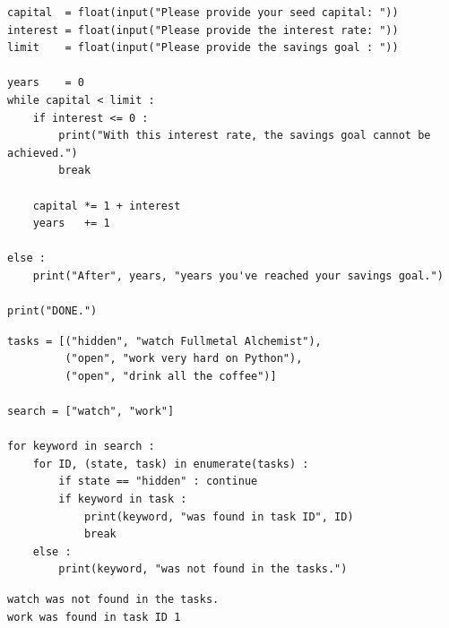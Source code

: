 \begin{frame}[fragile]
%
\begin{codebox}
\begin{verbatim}
capital  = float(input("Please provide your seed capital: "))
interest = float(input("Please provide the interest rate: "))
limit    = float(input("Please provide the savings goal : "))

years    = 0
while capital < limit :
    if interest <= 0 :
        print("With this interest rate, the savings goal cannot be achieved.")
        break
    
    capital *= 1 + interest
    years   += 1
    
else :
    print("After", years, "years you've reached your savings goal.")
  
print("DONE.")
\end{verbatim}
\end{codebox}
%
\end{frame}


\begin{frame}[fragile]
%
\vspace{-5pt}
\begin{codebox}
\begin{verbatim}
tasks = [("hidden", "watch Fullmetal Alchemist"),
         ("open", "work very hard on Python"),
         ("open", "drink all the coffee")]
         
search = ["watch", "work"]

for keyword in search :
    for ID, (state, task) in enumerate(tasks) :
        if state == "hidden" : continue
        if keyword in task :
            print(keyword, "was found in task ID", ID)
            break
    else :
        print(keyword, "was not found in the tasks.")
\end{verbatim}
\end{codebox}
%
\begin{cmdbox}
\begin{verbatim}
watch was not found in the tasks.
work was found in task ID 1
\end{verbatim}
\end{cmdbox}
%
\end{frame}

